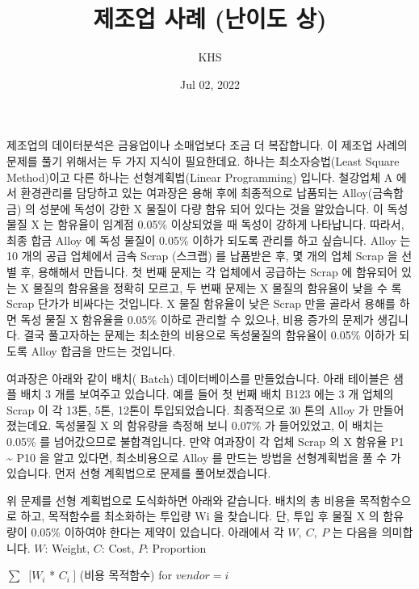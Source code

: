 \documentclass[letterpaper,10pt,english]{jupyterBook}
\title{제조업 사례 (난이도 상)}
\date{Jul 02, 2022}
\author{KHS}
\begin{document}
\pagestyle{empty}
\sphinxmaketitle
\pagestyle{plain}
\sphinxtableofcontents
\pagestyle{normal}
\label{\detokenize{chapter3/3.1.4_Use_Case::doc}}


\sphinxAtStartPar
제조업의 데이터분석은 금융업이나 소매업보다 조금 더 복잡합니다.  이 제조업 사례의 문제를 풀기 위해서는 두 가지 지식이 필요한데요. 하나는 최소자승법(Least Square Method)이고 다른 하나는 선형계획법(Linear Programming) 입니다.  철강업체 A 에서 환경관리를 담당하고 있는 여과장은 용해 후에 최종적으로 납품되는 Alloy(금속합금) 의 성분에 독성이 강한 X 물질이 다량 함유 되어 있다는 것을 알았습니다. 이 독성물질 X 는 함유율이 임계점 0.05\% 이상되었을 때 독성이 강하게 나타납니다. 따라서, 최종 합금 Alloy 에 독성 물질이 0.05\% 이하가 되도록 관리를 하고 싶습니다. Alloy 는 10 개의 공급 업체에서 금속 Scrap (스크랩) 를 납품받은 후, 몇 개의 업체 Scrap 을 선별 후, 용해해서 만듭니다. 첫 번째 문제는 각 업체에서 공급하는 Scrap 에 함유되어 있는 X 물질의 함유율을 정확히 모르고, 두 번째 문제는 X 물질의 함유율이 낮을 수 록 Scrap 단가가 비싸다는 것입니다. X 물질 함유율이 낮은 Scrap 만을 골라서 용해를 하면 독성 물질 X 함유율을 0.05\% 이하로 관리할 수 있으나, 비용 증가의 문제가 생깁니다. 결국 풀고자하는 문제는 최소한의 비용으로 독성물질의 함유율이 0.05\% 이하가 되도록 Alloy 합금을 만드는 것입니다.

\sphinxAtStartPar
여과장은 아래와 같이 배치( Batch) 데이터베이스를 만들었습니다. 아래 테이블은 샘플 배치 3 개를 보여주고 있습니다. 예를 들어 첫 번째 배치 B123 에는 3 개 업체의 Scrap 이 각 13톤, 5톤, 12톤이 투입되었습니다. 최종적으로 30 톤의 Alloy 가 만들어졌는데요. 독성물질 X 의 함유량을 측정해 보니 0.07\% 가 들어있었고, 이 배치는 0.05\% 를 넘어갔으므로 불합격입니다.  만약 여과장이 각 업체  Scrap 의 X 함유율 P1 \textasciitilde{} P10 을 알고 있다면, 최소비용으로 Alloy 를 만드는 방법을 선형계획법을 풀 수 가 있습니다. 먼저 선형 계획법으로 문제를 풀어보겠습니다.



\sphinxAtStartPar
위 문제를 선형 계획법으로 도식화하면 아래와 같습니다. 배치의 총 비용을 목적함수으로 하고, 목적함수를 최소화하는 투입량  Wi  을 찾습니다. 단, 투입 후 물질 X 의 함유량이 0.05\% 이하여야 한다는 제약이 있습니다.  아래에서 각 \( W,\ C,\ P \) 는  다음을 의미합니다.
\( W \): Weight, \( C \): Cost,  \( P \): Proportion

\sphinxAtStartPar
{} \( \sum\ \) \( [ W_i \) * \( C_i  \ ] \) (비용 목적함수) for \( vendor = i \)

\sphinxAtStartPar
{}
\end{document}

